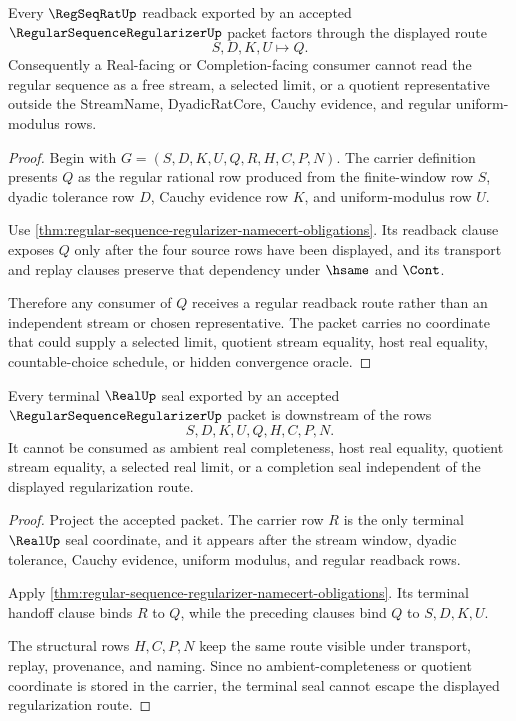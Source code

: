 \begin{theorem}
\label{thm:regular-sequence-regularizer-regseqrat-readback}
Every $\RegSeqRatUp$ readback exported by an accepted $\RegularSequenceRegularizerUp$ packet factors through the displayed route
$$
S,D,K,U \longmapsto Q .
$$
Consequently a Real-facing or Completion-facing consumer cannot read the regular sequence as a free stream, a selected limit, or a quotient representative outside the StreamName, DyadicRatCore, Cauchy evidence, and regular uniform-modulus rows.
\end{theorem}
\begin{proof}
Begin with $G=(S,D,K,U,Q,R,H,C,P,N)$. The carrier definition presents $Q$ as the regular rational row produced from the finite-window row $S$, dyadic tolerance row $D$, Cauchy evidence row $K$, and uniform-modulus row $U$.

Use \autoref{thm:regular-sequence-regularizer-namecert-obligations}. Its readback clause exposes $Q$ only after the four source rows have been displayed, and its transport and replay clauses preserve that dependency under $\hsame$ and $\Cont$.

Therefore any consumer of $Q$ receives a regular readback route rather than an independent stream or chosen representative. The packet carries no coordinate that could supply a selected limit, quotient stream equality, host real equality, countable-choice schedule, or hidden convergence oracle.
\end{proof}

\begin{theorem}
\label{thm:regular-sequence-regularizer-terminal-seal-nonescape}
Every terminal $\RealUp$ seal exported by an accepted $\RegularSequenceRegularizerUp$ packet is downstream of the rows
$$
S,D,K,U,Q,H,C,P,N .
$$
It cannot be consumed as ambient real completeness, host real equality, quotient stream equality, a selected real limit, or a completion seal independent of the displayed regularization route.
\end{theorem}
\begin{proof}
Project the accepted packet. The carrier row $R$ is the only terminal $\RealUp$ seal coordinate, and it appears after the stream window, dyadic tolerance, Cauchy evidence, uniform modulus, and regular readback rows.

Apply \autoref{thm:regular-sequence-regularizer-namecert-obligations}. Its terminal handoff clause binds $R$ to $Q$, while the preceding clauses bind $Q$ to $S,D,K,U$.

The structural rows $H,C,P,N$ keep the same route visible under transport, replay, provenance, and naming. Since no ambient-completeness or quotient coordinate is stored in the carrier, the terminal seal cannot escape the displayed regularization route.
\end{proof}

